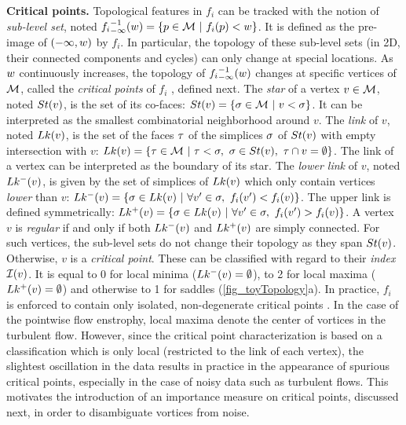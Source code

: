 \noindent
\textbf{Critical points.}
Topological features in $f_i$ can be tracked with the notion of
\emph{sub-level set}, noted
${f_i}^{-1}_{-\infty}(w)=\{p \in \mathcal{M}~|
~f_i(p) < w\}$. It is defined as the pre-image of  $(-\infty,
w)$
by
$f_i$.
In particular, the topology of these sub-level sets (in 2D, their connected
components and cycles) can only change at special locations.
As $w$ continuously increases, the topology of
${f_i}^{-1}_{-\infty}(w)$ changes at specific vertices of $\mathcal{M}$,
called the \emph{critical points} of $f_i$ \cite{banchoff70}, defined next.
The \emph{star} of a vertex $v \in \mathcal{M}$, noted $St(v)$,  is
the set of its co-faces:
$St(v) = \{ \sigma \in \mathcal{M} ~|~ v < \sigma \}$.
It can be interpreted as the smallest combinatorial neighborhood around $v$.
The \emph{link} of $v$,
noted $Lk(v)$, is the set of the faces $\tau$ of the simplices $\sigma$
of $St(v)$ with empty intersection with $v$:
$Lk(v) = \{ \tau \in \mathcal{M} ~ | ~ \tau < \sigma, ~
\sigma\in St(v), ~ \tau \cap v = \emptyset\}$.
The link of a vertex can
be interpreted as the boundary of its star.
The \emph{lower link} of $v$, noted $Lk^{-}(v)$, is given by the
set of simplices of $Lk(v)$ which only contain vertices \emph{lower} than
$v$:
$Lk^{-}(v) = \{ \sigma \in Lk(v) ~ | ~ \forall v' \in \sigma, ~ f_i(v')
< f_i(v)\}$. The upper link is defined symmetrically: $Lk^{+}(v) = \{
\sigma \in Lk(v) ~ | ~
\forall v' \in \sigma, ~ f_i(v') > f_i(v)\}$.
A vertex $v$ is \emph{regular}  if
and only if
both $Lk^{-}(v)$ and $Lk^{+}(v)$ are simply connected. For
such vertices, the sub-level sets do not change their topology as they span
$St(v)$. Otherwise, $v$ is
a \emph{critical point}.
These can be classified with regard to their
\emph{index} $\mathcal{I}(v)$.
It is equal to $0$ for local minima
($Lk^{-}(v) = \emptyset$), to 2 for local maxima
($Lk^{+}(v) = \emptyset$) and otherwise to 1 for
saddles (\autoref{fig_toyTopology}a).
In practice, $f_i$ is enforced to contain only isolated, non-degenerate
critical points \cite{edelsbrunner90, edelsbrunner03}.
In the case of
the pointwise flow enstrophy, local maxima denote the center of vortices in the
turbulent flow. However, since the critical point characterization is based on a
classification which is only local (restricted to the link of each vertex), the
slightest oscillation in the data results in practice in the appearance of
spurious critical points, especially in the case of noisy data such as
turbulent flows. This motivates the introduction of an importance measure on
critical points, discussed next, in order to disambiguate vortices from noise.




